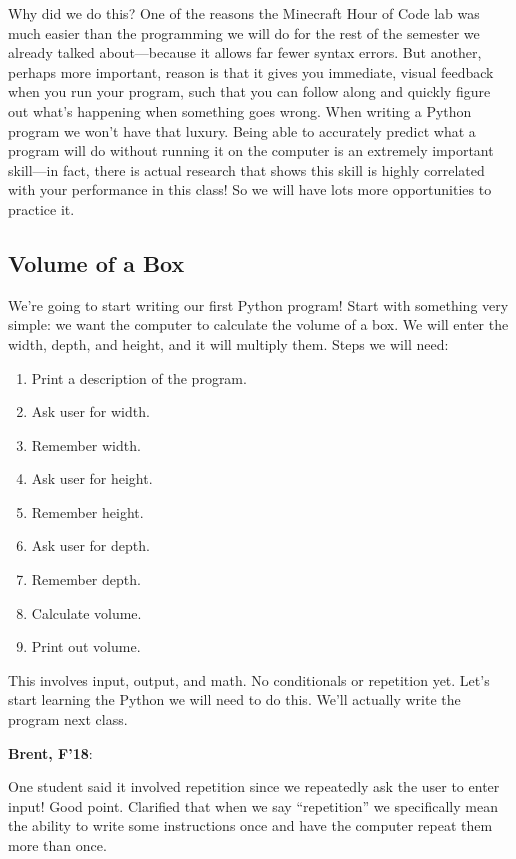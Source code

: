\documentclass{article}
\newenvironment{reflect}[1]
{
  \noindent
  \begin{lrbox}{\reflectbox}
    \begin{minipage}[t]{\textwidth}
      \textbf{#1}:
}{
    \end{minipage}
  \end{lrbox}
  \fbox{\usebox{\reflectbox}}
}
\begin{document}
Why did we do this?  One of the reasons the Minecraft Hour of Code lab
was much easier than the programming we will do for the rest of the
semester we already talked about---because it allows far fewer syntax
errors.  But another, perhaps more important, reason is that it gives
you immediate, visual feedback when you run your program, such that
you can follow along and quickly figure out what's happening when
something goes wrong.  When writing a Python program we won't have
that luxury.  Being able to accurately predict what a program will do
without running it on the computer is an extremely important
skill---in fact, there is actual research that shows this skill is
highly correlated with your performance in this class!  So we will
have lots more opportunities to practice it.

\subsection*{Volume of a Box}

We're going to start writing our first Python program!  Start with
something very simple: we want the computer to calculate the volume of
a box.  We will enter the width, depth, and height, and it will
multiply them.  Steps we will need:

\begin{enumerate}
\item Print a description of the program.
\item Ask user for width.
\item Remember width.
\item Ask user for height.
\item Remember height.
\item Ask user for depth.
\item Remember depth.
\item Calculate volume.
\item Print out volume.
\end{enumerate}

This involves input, output, and math.  No conditionals or repetition
yet.  Let's start learning the Python we will need to do this.  We'll
actually write the program next class.

\begin{reflect}{Brent, F'18}
  One student said it involved repetition since we repeatedly ask the
  user to enter input!  Good point.  Clarified that when we say
  ``repetition'' we specifically mean the ability to write some
  instructions once and have the computer repeat them more than once.
\end{reflect}
\end{document}
